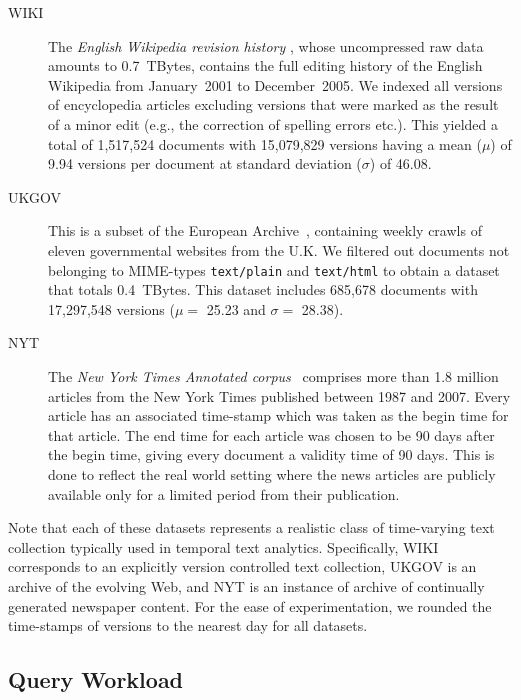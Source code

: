 \begin{description}
\item[WIKI]
{ The \emph{English Wikipedia revision history}
    \cite{wiki}, whose uncompressed raw data amounts to 0.7~TBytes,
    contains the full editing history of the English Wikipedia from
    January~2001 to December~2005. We indexed all versions of
    encyclopedia articles excluding versions that were marked as the
    result of a minor edit (e.g., the correction of spelling errors
    etc.). This yielded a total of 1,517,524 documents with 15,079,829
    versions having a mean ($\mu$) of 9.94 versions per document at
    standard deviation ($\sigma$) of 46.08.}
    
\item[UKGOV]
{ This is a subset of the European
    Archive~\cite{ea}, containing weekly crawls of eleven
    governmental websites from the U.K. We filtered out documents not
    belonging to MIME-types \texttt{text/plain} and
    \texttt{text/html} to obtain a dataset that totals 0.4~TBytes.
    This dataset includes 685,678 documents with 17,297,548 versions
    ($\mu = $ 25.23 and $\sigma = $ 28.38).}

\item[NYT]
{ The \emph{New York Times
      Annotated corpus}~\cite{NYT} comprises more than
    1.8 million articles from the New York Times published between
    1987 and 2007. Every article has an associated time-stamp which
    was taken as the begin time for that article. The end time for
    each article was chosen to be 90 days after the begin time, giving
    every document a validity time of 90 days. This is done to reflect
    the real world setting where the news articles are publicly
    available only for a limited period from their publication. }
    
\end{description}
Note that each of these datasets represents a realistic class of time-varying text collection typically used in temporal text
analytics. Specifically, WIKI corresponds to an explicitly version
controlled text collection, UKGOV is an archive of the evolving Web,
and NYT is an instance of archive of continually generated newspaper
content. For the ease of experimentation, we rounded the
time-stamps of versions to the nearest day for all datasets.

\subsection{Query Workload}

